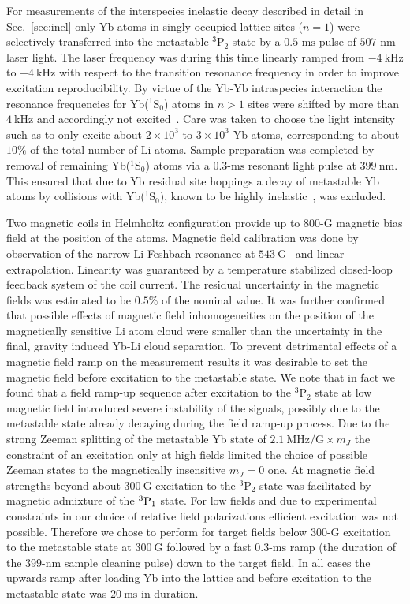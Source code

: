 \documentclass[twocolumn,superscriptaddress,showpacs,floatfix,amsmath,amssymb]{revtex4-1}
\newcommand{\singlet}{{}^1\mathrm{S}_0}
\newcommand{\triplet}{{}^3\mathrm{P}_2}
\newcommand{\nm}{\mathrm{nm}}
\newcommand{\msec}{\mathrm{ms}}
\newcommand{\G}{\mathrm{G}}
\newcommand{\kHz}{\mathrm{kHz}}
\newcommand{\MHz}{\mathrm{MHz}}
\begin{document}
For measurements of the interspecies inelastic decay described in detail in
Sec.~\ref{sec:inel} only Yb atoms in singly occupied lattice sites ($n = 1$)
were selectively transferred into the metastable $\triplet$ state by a
\mbox{$0.5$-$\msec$} pulse of \mbox{$507$-$\nm$} laser light. The laser
frequency was during this time linearly ramped from $-4~\kHz$ to $+4~\kHz$
with respect to the transition resonance frequency in order to improve
excitation reproducibility. By virtue of the Yb-Yb intraspecies interaction
the resonance frequencies for Yb($\singlet$) atoms in $n>1$ sites were shifted
by more than $4~\kHz$ and accordingly not excited~\cite{kato_laser_2016}. Care
was taken to choose the light intensity such as to only excite about
$2\times10^3$ to $3\times10^3$ Yb atoms, corresponding to about $10\%$ of the
total number of Li atoms. Sample preparation was completed by removal of
remaining Yb($\singlet$) atoms via a \mbox{$0.3$-$\msec$} resonant light pulse
at $399~\nm$. This ensured that due to Yb residual site hoppings a decay of
metastable Yb atoms by collisions with Yb($\singlet$), known to be highly
inelastic~\cite{uetake_spin-dependent_2012}, was excluded.

Two magnetic coils in Helmholtz configuration provide up to \mbox{$800$-$\G$}
magnetic bias field at the position of the atoms. Magnetic field calibration
was done by observation of the narrow Li Feshbach resonance at
$543~\G$~\cite{schunck_feshbach_2005} and linear extrapolation. Linearity was
guaranteed by a temperature stabilized closed-loop feedback system of the coil
current. The residual uncertainty in the magnetic fields was estimated to be
$0.5\%$ of the nominal value. It was further confirmed that possible effects
of magnetic field inhomogeneities on the position of the magnetically
sensitive Li atom cloud were smaller than the uncertainty in the final,
gravity induced Yb-Li cloud separation. To prevent detrimental effects of a
magnetic field ramp on the measurement results it was desirable to set the
magnetic field before excitation to the metastable state. We note that in fact
we found that a field ramp-up sequence after excitation to the $\triplet$
state at low magnetic field introduced severe instability of the signals,
possibly due to the metastable state already decaying during the field ramp-up
process. Due to the strong Zeeman splitting of the metastable Yb state of
$2.1~\MHz/\G \times m_J$ the constraint of an excitation only at high fields
limited the choice of possible Zeeman states to the magnetically insensitive
$m_J = 0$ one. At magnetic field strengths beyond about $300~\G$ excitation to
the $\triplet$ state was facilitated by magnetic admixture of the $^3{\rm
P}_1$ state. For low fields and due to experimental constraints in our choice
of relative field polarizations efficient excitation was not possible.
Therefore we chose to perform for target fields below \mbox{$300$-$\G$}
excitation to the metastable state at $300~\G$ followed by a fast
$0.3$-$\msec$ ramp (the duration of the \mbox{$399$-$\nm$} sample cleaning
pulse) down to the target field. In all cases the upwards ramp after loading
Yb into the lattice and before excitation to the metastable state was
$20~\msec$ in duration.
\end{document}
